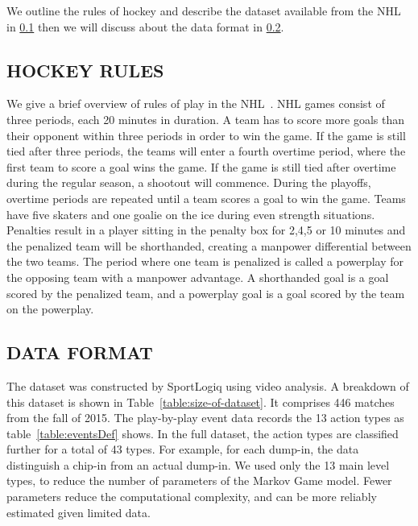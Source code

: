 We outline the rules of hockey and describe the dataset available from the NHL in \ref{subsec:rules} then we will discuss about the data format in \ref{subsec:dataset}.

\subsection{HOCKEY RULES} \label{subsec:rules}
We give a brief overview of rules of play in the NHL~\citep{NHL2014}. NHL games consist of three periods, each 20 minutes in duration. A team has to score more goals than their opponent within three periods in order to win the game. If the game is still tied after three periods, the teams will enter a fourth overtime period, where the first team to score a goal wins the game. If the game is still tied after overtime during the regular season, a shootout will commence. During the playoffs, overtime periods are repeated until a team scores a goal to win the game. Teams have five skaters and one goalie on the ice during even strength situations.
Penalties result in a player sitting in the penalty box for 2,4,5 or 10 minutes and the penalized team will be shorthanded, creating a manpower differential between the two teams.
The period where one team is penalized is called a powerplay for the opposing team with a manpower advantage.
A shorthanded goal is a goal scored by the penalized team, and a powerplay goal is a goal scored by the team on the powerplay.

\subsection{DATA FORMAT} \label{subsec:dataset}
The dataset was constructed by SportLogiq using video analysis. 
A breakdown of this dataset is shown in Table~\ref{table:size-of-dataset}. 
It comprises 446 matches from the fall of 2015. 
The play-by-play event data records the 13 action types as table~\ref{table:eventsDef} shows.
In the full dataset, the action types are classified further for a total of 43 types. For example, for each dump-in, the data distinguish a chip-in from an actual dump-in. We used only the 13 main level types, to reduce the number of parameters of the Markov Game model. Fewer parameters reduce the computational complexity, and can be more reliably estimated given limited data. 




